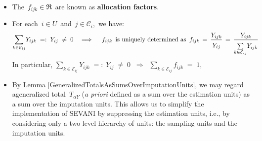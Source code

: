 \begin{remark}
\mbox{}
\vskip 0.1cm
\noindent
\begin{itemize}
\item
    The \,$f_{ijk} \in \Re$\, are known as \textbf{allocation factors}.
\item
    For each \,$i \in U$\, and \,$j \in \mathcal{C}_{i}$,\, we have:
    \begin{equation*}
    \underset{k\in\mathcal{E}_{ij}}{\sum}Y_{ijk}
    \; =: \;
        Y_{ij}
    \; \neq \;
        0
    \quad\Longrightarrow\quad
    \textnormal{
        $f_{ijk}$\,
        is uniquely determined as
        \,$
        f_{ijk}
        \,=\,
            \dfrac{Y_{ijk}}{
                \overset{{\color{white}.}}{Y_{ij}}
                }
        \,=\,
            \dfrac{Y_{ijk}}{
                \overset{{\color{white}.}}{\underset{k\in\mathcal{E}_{ij}}{\sum}Y_{ijk}}
                }
        $
        }
    \end{equation*}
    \vskip 0.1cm
    \noindent
    In particular,
    \;\;$
    \underset{k\in\mathcal{E}_{ij}}{\sum}Y_{ijk}
    \; =: \;
        Y_{ij}
    \; \neq \;
        0
    \;\;\Longrightarrow\;\;
    \underset{k\in\mathcal{E}_{ij}}{\sum}f_{ijk}
    \; = \;
        1
    $,\,
\item
    By Lemma \ref{GeneralizedTotalsAsSumsOverImputationUnits},
    we may regard ageneralized total \,$T_{\alpha Y}$
    (\textit{a priori} defined as a sum over the estimation units)
    as a sum over the imputation units.
    This allows us to simplify the implementation of SEVANI
    by suppressing the estimation units, i.e.,
    by considering only a two-level hierarchy of units:
    the sampling units and the imputation units.
\end{itemize}
\end{remark}

